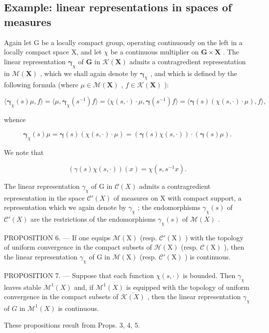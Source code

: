 \subsection{Example: linear representations in spaces of measures}

Again let G be a locally compact group, operating continuously on the left in a locally compact space X, and let \(\chi\) be a continuous multiplier on \(\mathbf{G} \times \mathbf{X}\) . The linear representation \(\boldsymbol{\gamma}_{\chi}\) of \(\mathbf{G}\) in \(\mathcal{K}(\mathbf{X})\) admits a contragredient representation in \(\mathcal{M}(\mathbf{X})\) , which we shall again denote by \(\boldsymbol{\gamma}_{\chi}\) , and which is defined by the following formula (where \(\mu \in \mathcal{M}(\mathbf{X})\) , \(f \in \mathcal{K}(\mathbf{X})\) ):

\[
\langle \boldsymbol {\gamma} _ {\chi} (s) \mu , f \rangle = \langle \mu , \boldsymbol {\gamma} _ {\chi} (s ^ {- 1}) f \rangle = \langle \chi (s, \cdot) \cdot \mu , \boldsymbol {\gamma} (s ^ {- 1}) f \rangle = \langle \boldsymbol {\gamma} (s) (\chi (s, \cdot) \cdot \mu), f \rangle ,
\]

whence

\[
\boldsymbol {\gamma} _ {\chi} (s) \mu = \boldsymbol {\gamma} (s) (\chi (s, \cdot) \cdot \mu) = (\boldsymbol {\gamma} (s) \chi (s, \cdot)) \cdot (\boldsymbol {\gamma} (s) \mu).
\]

We note that

\[
\left(\gamma (s) \chi (s, \cdot)\right) (x) = \chi (s, s ^ {- 1} x).
\]

The linear representation \(\gamma_{\chi}\) of G in \(\mathcal{C}(X)\) admits a contragredient representation in the space \(\mathcal{C}'(X)\) of measures on X with compact support, a representation which we again denote by \(\gamma_{\chi}\) ; the endomorphisms \(\gamma_{\chi}(s)\) of \(\mathcal{C}'(X)\) are the restrictions of the endomorphisms \(\gamma_{\chi}(s)\) of \(\mathcal{M}(X)\) .

PROPOSITION 6. --- If one equips \(\mathcal{M}(\mathrm{X})\) (resp. \(\mathcal{C}'(\mathrm{X})\) ) with the topology of uniform convergence in the compact subsets of \(\mathcal{H}(\mathrm{X})\) (resp. \(\mathcal{C}(\mathrm{X})\) ), then the linear representation \(\gamma_{\chi}\) of \(\mathrm{G}\) in \(\mathcal{M}(\mathrm{X})\) (resp. \(\mathcal{C}'(\mathrm{X})\) ) is continuous.

PROPOSITION 7. --- Suppose that each function \(\chi(s,\cdot)\) is bounded. Then \(\gamma_{\chi}\) leaves stable \(\mathcal{M}^{1}(X)\) and, if \(\mathcal{M}^{1}(X)\) is equipped with the topology of uniform convergence in the compact subsets of \(\overline{\mathcal{K}(X)}\) , then the linear representation \(\gamma_{\chi}\) of \(G\) in \(\mathcal{M}^{1}(X)\) is continuous.

These propositions result from Props. 3, 4, 5.

